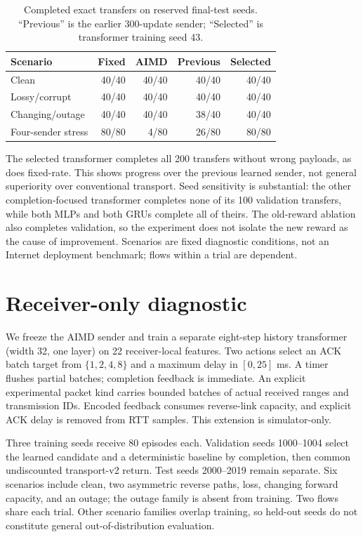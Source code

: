 \documentclass[11pt]{article}
\begin{document}
\begin{table}[ht]
\centering
\small
\begin{tabular}{@{}lrrrr@{}}
\toprule
Scenario & Fixed & AIMD & Previous & Selected \\
\midrule
Clean & 40/40 & 40/40 & 40/40 & 40/40 \\
Lossy/corrupt & 40/40 & 40/40 & 40/40 & 40/40 \\
Changing/outage & 40/40 & 40/40 & 38/40 & 40/40 \\
Four-sender stress & 80/80 & 4/80 & 26/80 & 80/80 \\
\bottomrule
\end{tabular}
\caption{Completed exact transfers on reserved final-test seeds. ``Previous'' is
the earlier 300-update sender; ``Selected'' is transformer training seed 43.}
\end{table}

The selected transformer completes all 200 transfers without wrong payloads, as
does fixed-rate. This shows progress over the previous learned sender, not general
superiority over conventional transport. Seed sensitivity is substantial: the
other completion-focused transformer completes none of its 100 validation
transfers, while both MLPs and both GRUs complete all of theirs. The old-reward
ablation also completes validation, so the experiment does not isolate the new
reward as the cause of improvement. Scenarios are fixed diagnostic conditions,
not an Internet deployment benchmark; flows within a trial are dependent.

\section{Receiver-only diagnostic}
We freeze the AIMD sender and train a separate eight-step history transformer
(width 32, one layer) on 22 receiver-local features. Two actions select an ACK
batch target from $\{1,2,4,8\}$ and a maximum delay in $[0,25]$ ms. A timer flushes
partial batches; completion feedback is immediate. An explicit experimental
packet kind carries bounded batches of actual received ranges and transmission
IDs. Encoded feedback consumes reverse-link capacity, and explicit ACK delay is
removed from RTT samples. This extension is simulator-only.

Three training seeds receive 80 episodes each. Validation seeds 1000--1004 select
the learned candidate and a deterministic baseline by completion, then common
undiscounted transport-v2 return. Test seeds 2000--2019 remain separate. Six
scenarios include clean, two asymmetric reverse paths, loss, changing forward
capacity, and an outage; the outage family is absent from training. Two flows
share each trial. Other scenario families overlap training, so held-out seeds do
not constitute general out-of-distribution evaluation.
\end{document}
